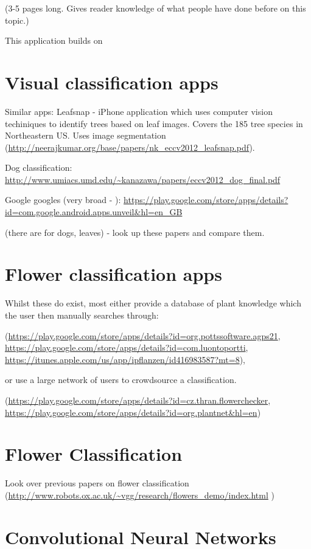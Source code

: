 \documentclass[11pt, a4paper]{report}
\begin{document}
(3-5 pages long. Gives reader knowledge of what people have done before on this topic.) 

This application builds on 

\section{Visual classification apps}

Similar apps:
Leafsnap - iPhone application which uses computer vision techiniques to identify trees based on leaf images. Covers the 185 tree species in Northeastern US. Uses image segmentation (\url{http://neerajkumar.org/base/papers/nk_eccv2012_leafsnap.pdf}). 

Dog classification:
\url{http://www.umiacs.umd.edu/~kanazawa/papers/eccv2012_dog_final.pdf}

Google googles (very broad - ):
\url{https://play.google.com/store/apps/details?id=com.google.android.apps.unveil&hl=en_GB}


 (there are for dogs, leaves) - look up these papers and compare them.

\section{Flower classification apps}
Whilst these do exist, most either provide a database of plant knowledge which the user then manually searches through:

(\url{https://play.google.com/store/apps/details?id=org.pottssoftware.agps21}, 
\url{https://play.google.com/store/apps/details?id=com.luontoportti}, 
\url{https://itunes.apple.com/us/app/ipflanzen/id416983587?mt=8}), 

or use a large network of users to crowdsource a classification. 

(\url{https://play.google.com/store/apps/details?id=cz.thran.flowerchecker}, \url{https://play.google.com/store/apps/details?id=org.plantnet&hl=en})


\section{Flower Classification}

Look over previous papers on flower classification (\url{http://www.robots.ox.ac.uk/~vgg/research/flowers_demo/index.html}	)

\section{Convolutional Neural Networks}
\end{document}
